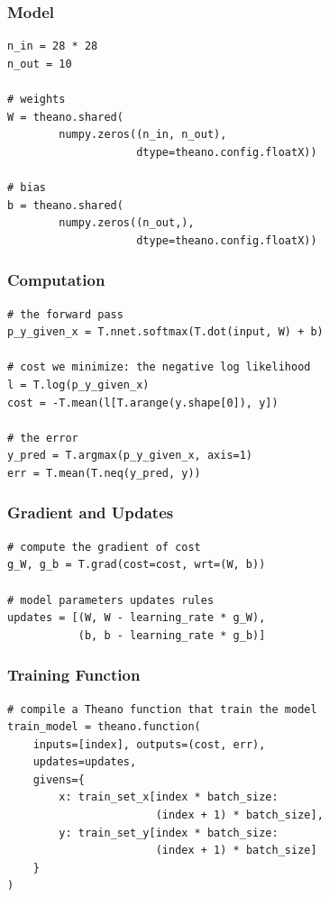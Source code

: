\documentclass[utf8x,xcolor=pdftex,dvipsnames,table]{beamer}
\begin{document}
\begin{frame}[fragile]
  \frametitle{Model}
\begin{lstlisting}
n_in = 28 * 28
n_out = 10

# weights
W = theano.shared(
        numpy.zeros((n_in, n_out),
                    dtype=theano.config.floatX))

# bias
b = theano.shared(
        numpy.zeros((n_out,),
                    dtype=theano.config.floatX))
\end{lstlisting}
\end{frame}


\begin{frame}[fragile]
  \frametitle{Computation}
\begin{lstlisting}
# the forward pass
p_y_given_x = T.nnet.softmax(T.dot(input, W) + b)

# cost we minimize: the negative log likelihood
l = T.log(p_y_given_x)
cost = -T.mean(l[T.arange(y.shape[0]), y])

# the error
y_pred = T.argmax(p_y_given_x, axis=1)
err = T.mean(T.neq(y_pred, y))
\end{lstlisting}
\end{frame}


\begin{frame}[fragile]
  \frametitle{Gradient and Updates}
\begin{lstlisting}
# compute the gradient of cost
g_W, g_b = T.grad(cost=cost, wrt=(W, b))

# model parameters updates rules
updates = [(W, W - learning_rate * g_W),
           (b, b - learning_rate * g_b)]
\end{lstlisting}
\end{frame}


\begin{frame}[fragile]
  \frametitle{Training Function}
\begin{lstlisting}
# compile a Theano function that train the model
train_model = theano.function(
    inputs=[index], outputs=(cost, err),
    updates=updates,
    givens={
        x: train_set_x[index * batch_size:
                       (index + 1) * batch_size],
        y: train_set_y[index * batch_size:
                       (index + 1) * batch_size]
    }
)
\end{lstlisting}
\end{frame}
\end{document}
